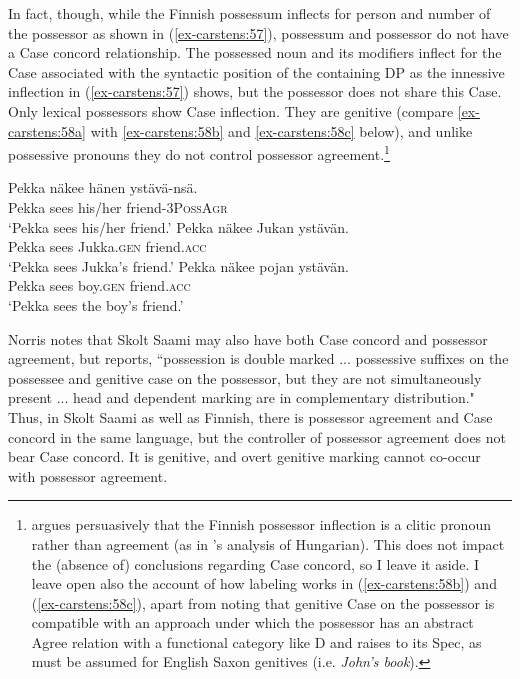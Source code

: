 \documentclass[output=paper
,modfonts
,nonflat]{langsci/langscibook}
\begin{document}
In fact, though, while the Finnish possessum inflects for person and number of the possessor as shown in (\ref{ex-carstens:57}), possessum and possessor do not have a Case concord relationship. The possessed noun and its modifiers inflect for the Case associated with the syntactic position of the containing DP as the innessive inflection in (\ref{ex-carstens:57}) shows, but the possessor does not share this Case. Only lexical possessors show Case inflection. They are genitive (compare \ref{ex-carstens:58a} with \ref{ex-carstens:58b} and \ref{ex-carstens:58c} below), and unlike possessive pronouns they do not control possessor agreement.\footnote{\label{note23}\citet{Toivonen2000} argues persuasively that the Finnish possessor inflection is a clitic pronoun rather than agreement (as in \citealt{Den_Dikken2015}'s analysis of Hungarian). This does not impact the (absence of) conclusions regarding Case concord, so I leave it aside. I leave open also the account of how labeling works in (\ref{ex-carstens:58b}) and (\ref{ex-carstens:58c}), apart from noting that genitive Case on the possessor is compatible with an approach under which the possessor has an abstract Agree relation with a functional category like D and raises to its Spec, as must be assumed for English Saxon genitives (i.e. \textit{John's book}).}    

\begin{exe}
	\ex \label{ex-carstens:58} \citep[582--583]{Toivonen2000} \xlist
	\ex \label{ex-carstens:58a}
	\gll Pekka n\"{a}kee  hänen     yst\"{a}v\"{a}-ns\"{a}.\\
	Pekka sees    his/her   friend-3P\textsc{oss}A\textsc{gr}\\
	\glt `Pekka sees his/her friend.'
	\ex \label{ex-carstens:58b}
	\gll Pekka n\"{a}kee   Jukan        yst\"{a}v\"{a}n.\\
	 Pekka sees       Jukka.\textsc{gen}   friend.\textsc{acc}\\
	\glt `Pekka sees Jukka's friend.'
	\ex \label{ex-carstens:58c}
	\gll Pekka n\"{a}kee   pojan       yst\"{a}v\"{a}n.\\
	Pekka sees     boy.\textsc{gen}     friend.\textsc{acc}\\
	\glt `Pekka sees the boy's friend.'
	\endxlist
\end{exe}
Norris notes that Skolt Saami may also have both Case concord and possessor agreement, but \citet{Miestamo2011} reports, ``possession is double marked ... possessive suffixes on the possessee and genitive case on the possessor, but they are not simultaneously present ... head and dependent marking are in complementary distribution." Thus, in Skolt Saami as well as Finnish, there is possessor agreement and Case concord in the same language, but the controller of possessor agreement does not bear Case concord. It is genitive, and overt genitive marking cannot co-occur with possessor agreement. 
\end{document}
